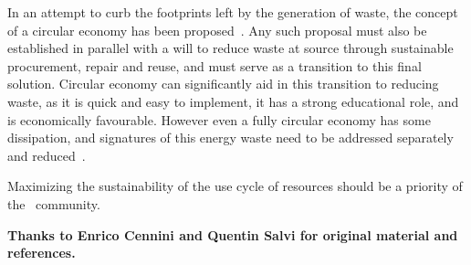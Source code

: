 \documentclass[../SustainableHEP.tex]{subfiles}
\begin{document}
In an attempt to curb the footprints left by the generation of waste, the concept of a circular economy has been proposed~\cite{CircularEconomy}.  Any such proposal must also be established in parallel with a will to reduce waste at source through sustainable procurement, repair and reuse, and must serve as a transition to this final solution.  Circular economy can significantly aid in this transition to reducing waste, as it is quick and easy to implement, it has a strong educational role, and is economically favourable.  However even a fully circular economy has some dissipation, and signatures of this energy waste need to be addressed separately and reduced~\cite{Forbes,SocialEurope,WRI}.

Maximizing the sustainability of the use cycle of resources should be a priority of the \ACR\ community.

{\footnotesize\bf Thanks to Enrico Cennini and Quentin Salvi for original material and references.}\\
\end{document}
